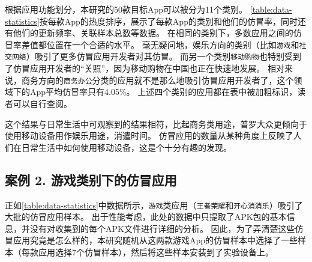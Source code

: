 根据应用功能划分，本研究的50款目标App可以被分为11个类别。
\autoref{table:data-statistics}按每款App的热度排序，展示了每款App的类别和他们的仿冒率，同时还有他们的更新频率、关联样本总数等数据。
在相同的类别下，多数应用之间的仿冒率差值都位置在一个合适的水平。
毫无疑问地，娱乐方向的类别（比如\texttt{游戏}和\texttt{社交网络}）吸引了更多仿冒应用开发者对其仿冒。
而另一个类别\texttt{移动购物}也特别受到了仿冒应用开发者的``关照''，因为移动购物在中国也正在快速地发展。
相对来说，商务方向的\texttt{商务办公}分类的应用就不是那么地吸引仿冒应用开发者了，这个领域下的App平均仿冒率只有4.05\%。
上述四个类别的应用都在表中被加粗标识，读者可以自行查阅。

这个结果与日常生活中可观察到的结果相符，比起商务类用途，普罗大众更倾向于使用移动设备用作娱乐用途，消遣时间。
仿冒应用的数量从某种角度上反映了人们在日常生活中如何使用移动设备，这是个十分有趣的发现。

\subsection{案例 2. 游戏类别下的仿冒应用}

正如\autoref{table:data-statistics}中数据所示，\texttt{游戏}类应用（\texttt{王者荣耀}和\texttt{开心消消乐}）吸引了大批的仿冒应用样本。
出于性能考虑，此处的数据中只提取了APK包的基本信息，并没有对收集到的每个APK文件进行详细的分析。
因此，为了弄清楚这些仿冒应用究竟是怎么样的，本研究随机从这两款游戏App的仿冒样本中选择了一些样本（每款应用选择7个仿冒样本），然后将这些样本安装到了实验设备上。

